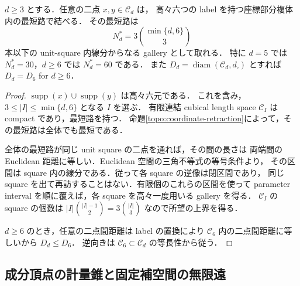 \begin{corollary}
\label{topo:six-label-gallery}
$d\ge3$ とする．任意の二点 $x,y\in\mathcal C_d$ は，
高々六つの label を持つ座標部分複体内の最短路で結べる．
その最短路は
\[
 N_d^*=3\binom{\min\{d,6\}}{3}
\]
本以下の unit-square 内線分からなる gallery として取れる．
特に $d=5$ では $N_d^*=30$，$d\ge6$ では $N_d^*=60$ である．
また $D_d=\operatorname{diam}(\mathcal C_d,d_\square)$ とすれば
$D_d=D_6$ for $d\ge6$．
\end{corollary}
\begin{proof}
$\operatorname{supp}(x)\cup\operatorname{supp}(y)$ は高々六元である．
これを含み，$3\le|I|\le\min\{d,6\}$ となる $I$ を選ぶ．
有限連結 cubical length space $\mathcal C_I$ は compact であり，最短路を持つ．
命題\ref{topo:coordinate-retraction}によって，その最短路は全体でも最短である．

全体の最短路が同じ unit square の二点を通れば，その間の長さは
両端間の Euclidean 距離に等しい．Euclidean 空間の三角不等式の等号条件より，
その区間は square 内の線分である．従って各 square の逆像は閉区間であり，
同じ square を出て再訪することはない．有限個のこれらの区間を使って
parameter interval を順に覆えば，各 square を高々一度用いる gallery を得る．
$\mathcal C_I$ の square の個数は $|I|\binom{|I|-1}{2}=3\binom{|I|}{3}$
なので所望の上界を得る．

$d\ge6$ のとき，任意の二点間距離は label の置換により
$\mathcal C_6$ 内の二点間距離に等しいから $D_d\le D_6$．
逆向きは $\mathcal C_6\subset\mathcal C_d$ の等長性から従う．
\end{proof}


\subsection{成分頂点の計量錐と固定補空間の無限遠}

